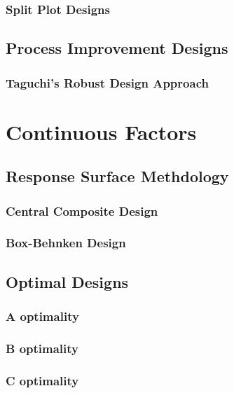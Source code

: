 \subsubsection{Split Plot Designs}




\subsection{Process Improvement Designs}



\subsubsection{Taguchi's Robust Design Approach}



\section{Continuous Factors}



\subsection{Response Surface Methdology}
\label{sec:response_surface}

\subsubsection{Central Composite Design}

\subsubsection{Box-Behnken Design}

\subsection{Optimal Designs}

\subsubsection{A optimality}
\subsubsection{B optimality}
\subsubsection{C optimality}
